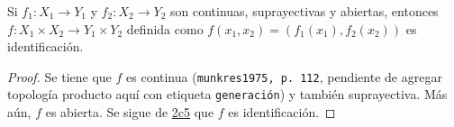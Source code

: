 

\begin{proposition}
Si $f_1 : X_1 \longrightarrow Y_1$ y $f_2 : X_2 \longrightarrow Y_2$ son continuas, suprayectivas y abiertas, entonces $f : X_1 \times X_2 \longrightarrow Y_1 \times Y_2$ definida como $f(x_1, x_2) = (f_1(x_1), f_2(x_2))$ es identificación.
\end{proposition}

\begin{proof}
Se tiene que $f$ es continua (\texttt{munkres1975, p. 112}, pendiente de agregar topología producto aquí con etiqueta \texttt{generación}) y también suprayectiva. Más aún, $f$ es abierta. Se sigue de \hyperref[card:2c5]{\textsf{2c5}} que $f$ es identificación.
\end{proof}
